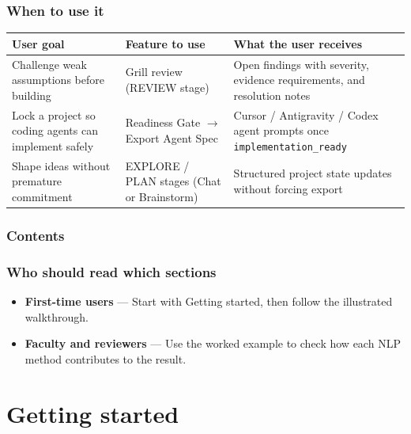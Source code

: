 \documentclass[11pt,a4paper]{article}
\begin{document}
\subsubsection*{When to use it}
\begin{tabularx}{\textwidth}{@{}Y Y Y@{}}
\toprule
\textbf{User goal} & \textbf{Feature to use} & \textbf{What the user receives} \\
\midrule
Challenge weak assumptions before building
  & Grill review (REVIEW stage)
  & Open findings with severity, evidence requirements, and resolution notes \\
\addlinespace
Lock a project so coding agents can implement safely
  & Readiness Gate \(\rightarrow\) Export Agent Spec
  & Cursor / Antigravity / Codex agent prompts once \texttt{implementation\_ready} \\
\addlinespace
Shape ideas without premature commitment
  & EXPLORE / PLAN stages (Chat or Brainstorm)
  & Structured project state updates without forcing export \\
\bottomrule
\end{tabularx}

\subsubsection*{Contents}
\tableofcontents

\vspace{0.6em}
\subsubsection*{Who should read which sections}
\begin{itemize}
  \item \textbf{First-time users} --- Start with Getting started, then follow the illustrated walkthrough.
  \item \textbf{Faculty and reviewers} --- Use the worked example to check how each NLP method contributes to the result.
\end{itemize}

\newpage

\section{Getting started}
\label{sec:getting-started}
\end{document}
